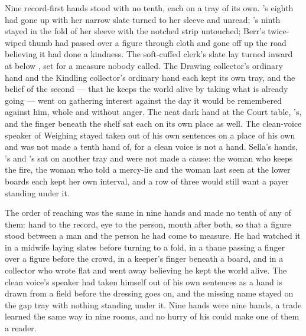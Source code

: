 Nine record-first hands stood with no tenth, each on a tray of its own. 's eighth had gone up  with her narrow slate turned to her sleeve and unread; 's ninth stayed in the fold of her sleeve with the notched strip untouched; Berr's twice-wiped thumb had passed over a figure through cloth and gone off up the road believing it had done a kindness. The soft-cuffed clerk's slate lay turned inward at  below , set for a measure nobody called. The Drawing collector's ordinary hand and the Kindling collector's ordinary hand each kept its own tray, and the belief of the second --- that he keeps the world alive by taking what is already going --- went on gathering interest against the day it would be remembered against him, whole and without anger. The neat dark hand at the Court table, 's, and the finger beneath the shelf sat each on its own place as well. The clean-voice speaker of Weighing stayed taken out of his own sentences on a place of his own and was not made a tenth hand of, for a clean voice is not a hand. Sella's hands, 's and 's sat on another tray and were not made a cause: the woman who keeps the fire, the woman who told a mercy-lie and the woman last seen at the lower boards each kept her own interval, and a row of three would still want a payer standing under it.

The order of reaching was the same in nine hands and made no tenth of any of them: hand to the record, eye to the person, mouth after both, so that a figure stood between a man and the person he had come to measure. He had watched it in a midwife laying slates before turning to a fold, in a thane passing a finger over a figure before the crowd, in a keeper's finger beneath a board, and in a collector who wrote flat and went away believing he kept the world alive. The clean voice's speaker had taken himself out of his own sentences as a hand is drawn from a field before the dressing goes on, and the missing name stayed on the gap tray with nothing standing under it. Nine hands were nine hands, a trade learned the same way in nine rooms, and no hurry of his could make one of them a reader.

